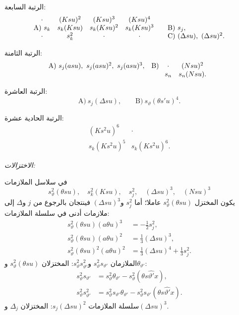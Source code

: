 \documentclass[11pt]{article}
\begin{document}
\noindent الرتبة السابعة:
\[
\begin{array}{c@{\quad}c@{\quad}c@{\quad}c@{\qquad}l}
\cdot&(Ksu)^2&(Ksu)^3&(Ksu)^4&\\
\text{A)}\ s_k&s_k(Ksu)&s_k(Ksu)^2&s_k(Ksu)^3&
\text{B)}\ s_j,\\
\cdot&s_k^2&\cdot&\cdot&
\text{C)}\ (\Delta su),\ (\Delta su)^2.
\end{array}
\]

\noindent الرتبة الثامنة:
\[
\begin{array}{ll}
\text{A)}\ s_j(asu),\ s_j(asu)^2,\ s_j(asu)^3,
&
\text{B)}\ \begin{array}[t]{cc}
\cdot&(Nsu)^2\\
s_n&s_n(Nsu).
\end{array}
\end{array}
\]

\noindent الرتبة العاشرة:
\[
\text{A)}\ s_j(\Delta su),\qquad \text{B)}\ s_\vartheta(\theta s'u)^4.
\]

\noindent الرتبة الحادية عشرة:
\[
\begin{array}{cc}
(Ks^2u)^6&\cdot\\
s_k(Ks^2u)^5&s_k(Ks^2u)^6.
\end{array}
\]

\noindent\emph{الاختزالات:}

في سلاسل الملازمات
\[
 s_\vartheta^2(\theta su),\quad s_k^2(Ksu),\quad s_j^2,\quad (\Delta su)^3,\quad (Nsu)^3
\]
يكون المختزل $s_\vartheta^2(\theta su)$ عاملا؛ أما $s_j^2$ و$(\Delta su)^3$ فينتجان بالرجوع من $j$ و$\Delta$ إلى ملازمات أدنى في سلسلة الملازمات:
\[
\begin{aligned}
s_\vartheta^2(\theta su)(a\theta u)^3&=-\frac12s_j^2,\\
s_\vartheta^2(\theta su)(a\theta u)^2&=\frac13(\Delta su)^3,\\
s_\vartheta^2(\theta su)^2(a\theta u)^2&=\frac13(\Delta su)^4+\frac13s_j^2.
\end{aligned}
\]
الملازمان $s_\vartheta^2s_{\vartheta'}$ و$s_\vartheta^2s_{\vartheta'}^2$: المختزلان $s_\vartheta^2(\theta su)$ و$\theta_{\vartheta'}$:
\[
\begin{aligned}
s_\vartheta^2s_{\vartheta'}&=s_\vartheta^2\theta_{\vartheta'}-s_\vartheta^2(\theta s\widehat{\vartheta'}x),\\
s_\vartheta^2s_{\vartheta'}^2&=s_\vartheta^2s_{\vartheta'}\theta_{\vartheta'}-s_\vartheta^2s_{\vartheta'}(\theta s\widehat{\vartheta'}x).
\end{aligned}
\]
سلسلة الملازمات $s_j(\Delta su)^2$: المختزلان $\Delta_j$ و$(\Delta su)^3$.
\end{document}
